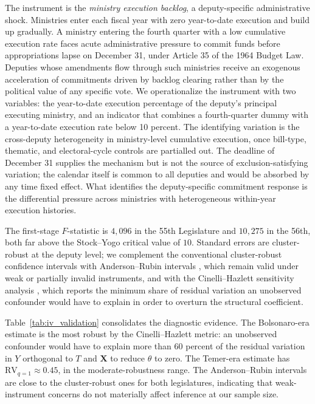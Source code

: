 \documentclass[pdflatex,sn-basic]{sn-jnl}
\begin{document}
The instrument is the \emph{ministry execution backlog}, a deputy-specific administrative shock. Ministries enter each fiscal year with zero year-to-date execution and build up gradually. A ministry entering the fourth quarter with a low cumulative execution rate faces acute administrative pressure to commit funds before appropriations lapse on December 31, under Article 35 of the 1964 Budget Law. Deputies whose amendments flow through such ministries receive an exogenous acceleration of commitments driven by backlog clearing rather than by the political value of any specific vote. We operationalize the instrument with two variables: the year-to-date execution percentage of the deputy's principal executing ministry, and an indicator that combines a fourth-quarter dummy with a year-to-date execution rate below 10 percent. The identifying variation is the cross-deputy heterogeneity in ministry-level cumulative execution, once bill-type, thematic, and electoral-cycle controls are partialled out. The deadline of December 31 supplies the mechanism but is not the source of exclusion-satisfying variation; the calendar itself is common to all deputies and would be absorbed by any time fixed effect. What identifies the deputy-specific commitment response is the differential pressure across ministries with heterogeneous within-year execution histories.

The first-stage $F$-statistic is $4{,}096$ in the 55th Legislature and $10{,}275$ in the 56th, both far above the Stock--Yogo critical value of $10$. Standard errors are cluster-robust at the deputy level; we complement the conventional cluster-robust confidence intervals with Anderson--Rubin intervals \citep{AndersonRubin1949}, which remain valid under weak or partially invalid instruments, and with the Cinelli--Hazlett sensitivity analysis \citep{CinelliHazlett2020}, which reports the minimum share of residual variation an unobserved confounder would have to explain in order to overturn the structural coefficient.

Table~\ref{tab:iv_validation} consolidates the diagnostic evidence. The Bolsonaro-era estimate is the most robust by the Cinelli--Hazlett metric: an unobserved confounder would have to explain more than $60$ percent of the residual variation in $Y$ orthogonal to $T$ and $\mathbf{X}$ to reduce $\hat\theta$ to zero. The Temer-era estimate has $\mathrm{RV}_{q=1} \approx 0.45$, in the moderate-robustness range. The Anderson--Rubin intervals are close to the cluster-robust ones for both legislatures, indicating that weak-instrument concerns do not materially affect inference at our sample size.
\end{document}
